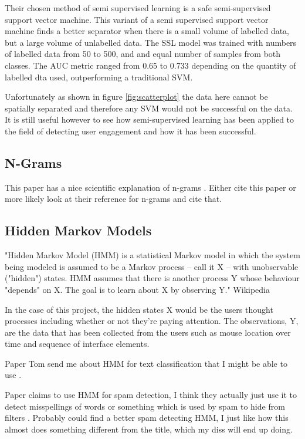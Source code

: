 \documentclass{article}
\begin{document}
Their chosen method of semi supervised learning is a safe semi-supervised support vector machine.
This variant of a semi supervised support vector machine finds a better separator when there is a small volume of labelled data, but a large volume of unlabelled data.
The SSL model was trained with numbers of labelled data from 50 to 500, and and equal number of samples from both classes.
The AUC metric ranged from 0.65 to 0.733 depending on the quantity of labelled dta used, outperforming a traditional SVM.

Unfortunately as shown in figure \ref{fig:scatterplot} the data here cannot be spatially separated and therefore any SVM would not be successful on the data. 
It is still useful however to see how semi-supervised learning has been applied to the field of detecting user engagement and how it has been successful.

\subsection{N-Grams}
This paper has a nice scientific explanation of n-grams \cite{tomovic2006n}.
Either cite this paper or more likely look at their reference for n-grams and cite that.

\subsection{Hidden Markov Models}


"Hidden Markov Model (HMM) is a statistical Markov model in which the system being modeled is assumed to be a Markov process – call it X – with unobservable ("hidden") states. 
HMM assumes that there is another process Y whose behaviour "depends" on X.
The goal is to learn about X by observing Y." Wikipedia

In the case of this project, the hidden states X would be the users thought processes including whether or not they're paying attention.
The observations, Y, are the data that has been collected from the users such as mouse location over time and sequence of interface elements.

Paper Tom send me about HMM for text classification that I might be able to use \cite{collins2016tagging}.

Paper claims to use HMM for spam detection, I think they actually just use it to detect misspellings of words or something which is used by spam to hide from filters \cite{gordillo2007hmm}.
Probably could find a better spam detecting HMM, I just like how this almost does something different from the title, which my diss will end up doing.
\end{document}

